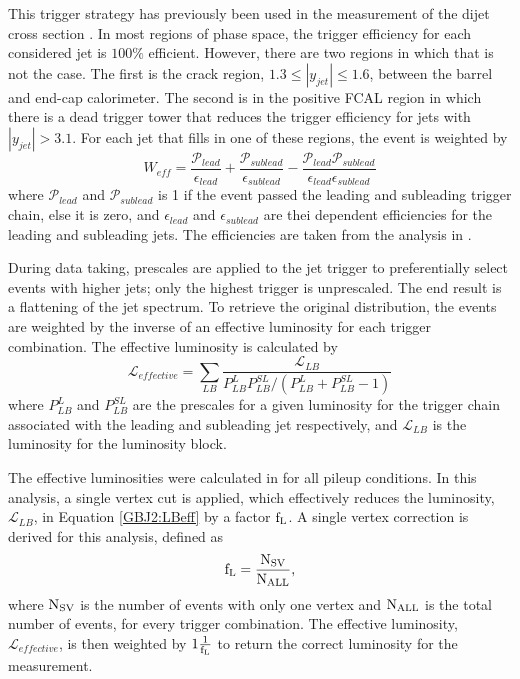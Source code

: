 This trigger strategy has previously been used in the measurement of the dijet cross section \cite{ref:Dijet}.
In most regions of phase space, the trigger efficiency for each considered jet is $100\%$ efficient.
However, there are two regions in which that is not the case.
The first is the crack region, $1.3\le|y_{jet}|\le1.6$, between the barrel and end-cap calorimeter.
The second is in the positive FCAL region in which there is a dead trigger tower that reduces the trigger efficiency for jets with $|y_{jet}|>3.1$.
For each jet that fills in one of these regions, the event is weighted by 
\begin{equation}
W_{eff}= \frac{\mathcal{P}_{lead}}{\epsilon_{lead}} + \frac{\mathcal{P}_{sublead}}{\epsilon_{sublead}} -\frac{\mathcal{P}_{lead}\mathcal{P}_{sublead}}{\epsilon_{lead}\epsilon_{sublead}}
\label{GBJ2:Eff}
\end{equation}
where $\mathcal{P}_{lead}$ and $\mathcal{P}_{sublead}$ is 1 if the event passed the leading and subleading trigger chain, else it is zero, and $\epsilon_{lead}$ and $\epsilon_{sublead}$ are thei \pt{} dependent efficiencies for the leading and subleading jets.
The efficiencies are taken from the analysis in \cite{ref:Dijet}.

During data taking, prescales are applied to the jet trigger to preferentially select events with higher \pt{} jets; only the highest \pt{} trigger is unprescaled.
The end result is a flattening of the jet \pt{} spectrum.
To retrieve the original distribution, the events are weighted by the inverse of an effective luminosity for each trigger combination.
The  effective luminosity is calculated by
\begin{equation}
\mathcal{L}_{effective} = \sum_{LB} \frac{\mathcal{L}_{LB}}{P_{LB}^L P_{LB}^{SL}/(P_{LB}^L + P_{LB}^{SL} -1)}
\label{GBJ2:LBeff}
\end{equation}
where $P_{LB}^L$ and $P_{LB}^{SL}$ are the prescales for a given luminosity for the trigger chain associated with the leading and subleading jet respectively, and $\mathcal{L}_{LB}$ is the luminosity for the luminosity block. 

The effective luminosities were calculated in \cite{ref:Dijet} for all pileup conditions.
In this analysis, a single vertex cut is applied, which effectively reduces the luminosity, $\mathcal{L}_{LB}$, in Equation \ref{GBJ2:LBeff} by a factor $\rm f_{L}$.
A single vertex correction is derived for this analysis, defined as 
\begin{equation}
\rm f_{L} = \frac{N_{SV}}{N_{ALL}},
\label{GBJ2:SVCorrection}
\end{equation}
where $\rm N_{SV}$ is the number of events with only one vertex and  $\rm N_{ALL}$ is the total number of events, for every trigger combination.
The effective luminosity, $\mathcal{L}_{effective}$, is then weighted by $1\frac{1}{\rm f_{L}}$ to return the correct luminosity for the measurement.


